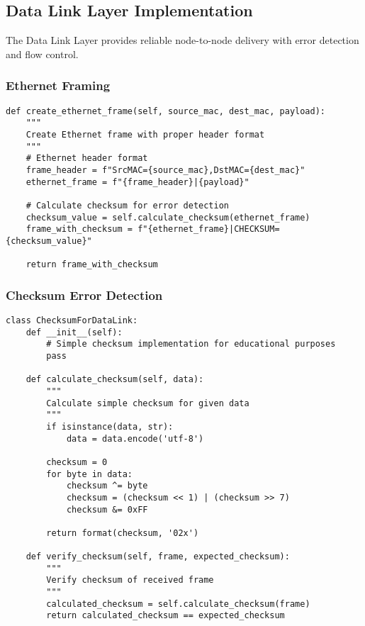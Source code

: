 \documentclass[12pt,a4paper]{article}
\begin{document}
\subsection{Data Link Layer Implementation}

The Data Link Layer provides reliable node-to-node delivery with error detection and flow control.

\subsubsection{Ethernet Framing}

\begin{lstlisting}[caption=Ethernet Frame Creation]
def create_ethernet_frame(self, source_mac, dest_mac, payload):
    """
    Create Ethernet frame with proper header format
    """
    # Ethernet header format
    frame_header = f"SrcMAC={source_mac},DstMAC={dest_mac}"
    ethernet_frame = f"{frame_header}|{payload}"
    
    # Calculate checksum for error detection
    checksum_value = self.calculate_checksum(ethernet_frame)
    frame_with_checksum = f"{ethernet_frame}|CHECKSUM={checksum_value}"
    
    return frame_with_checksum
\end{lstlisting}

\subsubsection{Checksum Error Detection}

\begin{lstlisting}[caption=Checksum Implementation]
class ChecksumForDataLink:
    def __init__(self):
        # Simple checksum implementation for educational purposes
        pass

    def calculate_checksum(self, data):
        """
        Calculate simple checksum for given data
        """
        if isinstance(data, str):
            data = data.encode('utf-8')
        
        checksum = 0
        for byte in data:
            checksum ^= byte
            checksum = (checksum << 1) | (checksum >> 7)
            checksum &= 0xFF
        
        return format(checksum, '02x')

    def verify_checksum(self, frame, expected_checksum):
        """
        Verify checksum of received frame
        """
        calculated_checksum = self.calculate_checksum(frame)
        return calculated_checksum == expected_checksum
\end{lstlisting}
\end{document}
